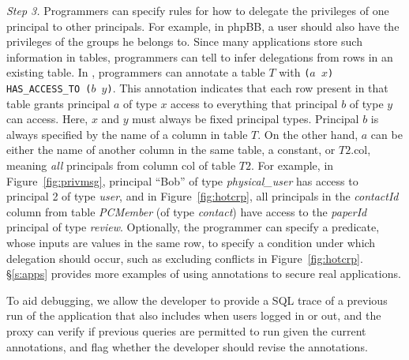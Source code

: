 {\em Step 3.}  Programmers can specify rules for how to delegate the
privileges of one principal to other principals.  For example, in
phpBB, a user should also have the privileges of the groups he belongs
to.  Since many applications store such information in tables,
programmers can tell \name to infer delegations from rows in an
existing table.  In \name, programmers can annotate a table $T$ with
{\tt \small ($a$ $x$) HAS\_ACCESS\_TO ($b$ $y$)}.
This annotation indicates that each row present in that table grants
principal $a$ of type $x$ access to everything that principal $b$ of
type $y$ can access.  Here, $x$ and $y$ must always be fixed principal
types.  Principal $b$ is always specified by the name of a column in
table $T$.  On the other hand, $a$ can be either the name of another
column in the same table, a constant, or $T2.\textrm{col}$, meaning {\em all}
principals from column $\textrm{col}$ of table $T2$.  For example, in
Figure~\ref{fig:privmsg}, principal ``Bob'' of type {\em
  physical\_user} has access to principal 2 of type {\em user}, and
in Figure~\ref{fig:hotcrp}, all principals in the {\em contactId}
column from table {\em PCMember} (of type {\em contact}) have access
to the {\em paperId} principal of type {\em review}.  Optionally, the
programmer can specify a predicate, whose inputs are values in the
same row, to specify a condition under which delegation should occur,
such as excluding conflicts in Figure~\ref{fig:hotcrp}.
\S\ref{s:apps} provides more examples of using annotations to secure
real applications.



To aid debugging, we allow the developer to provide a SQL trace of a
previous run of the application that also includes when users logged
in or out, and the proxy can verify if previous queries are permitted
to run given the current annotations, and flag whether the developer
should revise the annotations.



